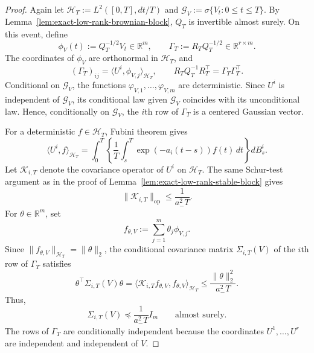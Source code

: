 \documentclass[11pt]{article}
\begin{document}
\begin{proof}
Again let $\mathcal H_T:=L^2([0,T],dt/T)$ and $\mathcal G_V:=\sigma\{V_t:0\leq t\leq T\}$. By
Lemma~\ref{lem:exact-low-rank-brownian-block}, $Q_T$ is invertible almost
surely. On this event, define
\[
    \phi_V(t):=Q_T^{-1/2}V_t\in\mathbb R^m,
    \qquad
    \Gamma_T:=R_TQ_T^{-1/2}\in\mathbb R^{r\times m}.
\]
The coordinates of $\phi_V$ are orthonormal in $\mathcal H_T$, and
\begin{equation}
    (\Gamma_T)_{ij}=\langle U^i,\phi_{V,j}\rangle_{\mathcal H_T},
    \qquad
    R_TQ_T^{-1}R_T^\top=\Gamma_T\Gamma_T^\top.
\label{eq:exact-low-rank-cross-representation}
\end{equation}
Conditional on $\mathcal G_V$, the functions
$\varphi_{V,1},\ldots,\varphi_{V,m}$ are deterministic. Since $U^i$ is
independent of $\mathcal G_V$, its conditional law given $\mathcal G_V$
coincides with its unconditional law. Hence, conditionally on
$\mathcal G_V$, the $i$th row of $\Gamma_T$ is a centered Gaussian vector.

For a deterministic $f\in\mathcal H_T$, Fubini theorem gives
\begin{equation}
    \langle U^i,f\rangle_{\mathcal H_T}
    =\int_0^T\left\{
        \frac1T\int_s^T \exp(-a_i(t-s))f(t)\,dt
    \right\}dB_s^i.
\label{eq:exact-low-rank-ito-functional}
\end{equation}
Let $\mathcal K_{i,T}$ denote the covariance operator of $U^i$ on
$\mathcal H_T$. The same Schur-test argument as in the proof of
Lemma~\ref{lem:exact-low-rank-stable-block} gives
\[
    \|\mathcal K_{i,T}\|_{\mathrm{op}}\leq\frac1{a_-^2T}.
\]
For $\theta\in\mathbb R^m$, set
\[
    f_{\theta,V}:=\sum_{j=1}^m\theta_j\phi_{V,j}.
\]
Since $\|f_{\theta,V}\|_{\mathcal H_T}=\|\theta\|_2$, the conditional
covariance matrix $\Sigma_{i,T}(V)$ of the $i$th row of $\Gamma_T$ satisfies
\[
    \theta^\top\Sigma_{i,T}(V)\theta
    =\langle\mathcal K_{i,T}f_{\theta,V},f_{\theta,V}\rangle_{\mathcal H_T}
    \leq\frac{\|\theta\|_2^2}{a_-^2T}.
\]
Thus,
\begin{equation}
    \Sigma_{i,T}(V)\preceq\frac1{a_-^2T}I_m
    \qquad\text{almost surely}.
\label{eq:exact-low-rank-row-covariance-bound}
\end{equation}
The rows of $\Gamma_T$ are conditionally independent because the coordinates
$U^1,\ldots,U^r$ are independent and independent of $V$.


\end{proof}
\end{document}
